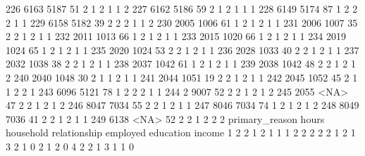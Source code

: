 \documentclass[
  letterpaper,
  DIV=11,
  numbers=noendperiod]{scrreprt}
\newenvironment{Shaded}{\begin{snugshade}}{\end{snugshade}}
\newcommand{\NormalTok}[1]{\textcolor[rgb]{0.00,0.23,0.31}{#1}}
\begin{document}
\begin{Shaded}
\begin{Highlighting}[]
\NormalTok{226 6163 5187  51          2      1        2         1    1                 2}
\NormalTok{227 6162 5186  59          2      1        2         1    1                 1}
\NormalTok{228 6149 5174  87          1      2        2         2    1                 1}
\NormalTok{229 6158 5182  39          2      2        2         1    1                 2}
\NormalTok{230 2005 1006  61          1      2        1         2    1                 1}
\NormalTok{231 2006 1007  35          2      2        1         2    1                 1}
\NormalTok{232 2011 1013  66          1      2        1         2    1                 1}
\NormalTok{233 2015 1020  66          1      2        1         2    1                 1}
\NormalTok{234 2019 1024  65          1      2        1         2    1                 1}
\NormalTok{235 2020 1024  53          2      2        1         2    1                 1}
\NormalTok{236 2028 1033  40          2      2        1         2    1                 1}
\NormalTok{237 2032 1038  38          2      2        1         2    1                 1}
\NormalTok{238 2037 1042  61          1      2        1         2    1                 1}
\NormalTok{239 2038 1042  48          2      2        1         2    1                 2}
\NormalTok{240 2040 1048  30          2      1        1         2    1                 1}
\NormalTok{241 2044 1051  19          2      2        1         2    1                 1}
\NormalTok{242 2045 1052  45          2      1        1         2    2                 1}
\NormalTok{243 6096 5121  78          1      2        2         2    1                 1}
\NormalTok{244    2 9007  52          2      2        1         2    1                 2}
\NormalTok{245 2055 \textless{}NA\textgreater{}  47          2      2        1         2    1                 2}
\NormalTok{246 8047 7034  55          2      2        1         2    1                 1}
\NormalTok{247 8046 7034  74          1      2        1         2    1                 2}
\NormalTok{248 8049 7036  41          2      2        1         2    1                 1}
\NormalTok{249 6138 \textless{}NA\textgreater{}  52          2      2        1         2    2                 2}
\NormalTok{    primary\_reason hours household relationship employed education income}
\NormalTok{1                2     2         1            2        1         1      1}
\NormalTok{2                2     2         2            2        1         2      1}
\NormalTok{3                2     1         0            2        1         2      0}
\NormalTok{4                2     2         1            3        1         1      0}

\end{Highlighting}
\end{Shaded}
\end{document}
